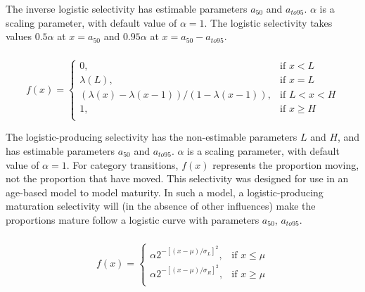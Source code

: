 The inverse logistic selectivity has estimable parameters $a_{50}$ and $a_{to95}$. $\alpha$ is a scaling parameter, with default value of $\alpha = 1$. The logistic selectivity takes values $0.5 \alpha$ at $x=a_{50}$ and $0.95 \alpha$ at $x=a_{50}-a_{to95}$. 

\subsubsection[Logistic producing]{}

\begin{equation} 
f(x)=\begin{cases}
	  0, & \text{if $x < L$} \\
	  \lambda(L), & \text{if $x=L$} \\
	  \left( \lambda(x)-\lambda(x-1) \right) / \left( 1-\lambda(x-1) \right), & \text{if $L < x < H$} \\
	  1, & \text{if $x \ge H$} \\  
  \end{cases}
\end{equation}

The logistic-producing selectivity has the non-estimable parameters $L$ and $H$, and has estimable parameters $a_{50}$ and $a_{to95}$. $\alpha$ is a scaling parameter, with default value of $\alpha = 1$. For category transitions, $f(x)$ represents the proportion moving, not the proportion that have moved. This selectivity was designed for use in an age-based model to model maturity. In such a model, a logistic-producing maturation selectivity will (in the absence of other influences) make the proportions mature follow a logistic curve with parameters $a_{50}$, $a_{to95}$.

\subsubsection[Double-normal]{}

\begin{equation}
  f(x) = \begin{cases}
    \alpha 2^{-[(x- \mu)/\sigma_L ]^2}, & \text{if $x \leq \mu$} \\
    \alpha 2^{-[(x- \mu)/\sigma_R ]^2}, & \text{if $x \ge \mu$}\\
  \end{cases}
\end{equation} 

